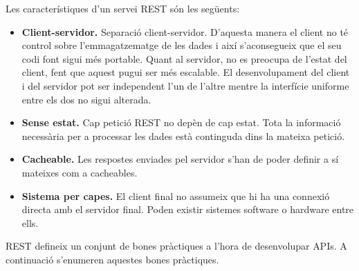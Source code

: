 Les característiques d'un servei \ac{REST} són les següents:
\begin{itemize}
	
	\item \textbf{Client-servidor.} Separació client-servidor. D'aquesta manera el client no té control sobre l'emmagatzematge de les dades i així s'aconsegueix que el seu codi font sigui més portable. Quant al servidor, no es preocupa de l'estat del client, fent que aquest pugui ser més escalable. El desenvolupament del client i del servidor pot ser independent l'un de l'altre mentre la interfície uniforme entre els dos no sigui alterada.
	
	\item \textbf{Sense estat.} Cap petició \ac{REST} no depèn de cap estat. Tota la informació necessària per a processar les dades està continguda dins la mateixa petició.
	
	\item \textbf{Cacheable.} Les respostes enviades pel servidor s'han de poder definir a sí mateixes com a cacheables.
	
	\item \textbf{Sistema per capes.} El client final no assumeix que hi ha una connexió directa amb el servidor final. Poden existir sistemes software o hardware entre ells.
	
\end{itemize}

\ac{REST} defineix un conjunt de bones pràctiques a l'hora de desenvolupar \ac{API}s. A continuació s'enumeren aquestes bones pràctiques.

